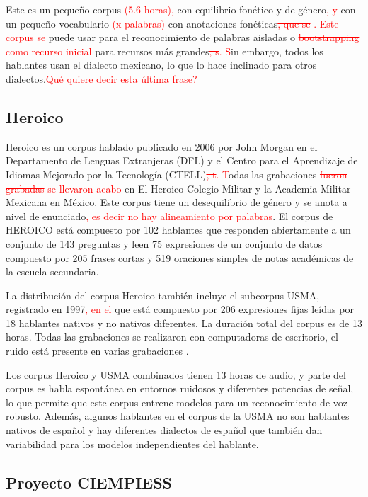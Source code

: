 \documentclass[a4paper,12pt,twoside]{report}
\newcommand{\macb}{\textcolor{red}}
\begin{document}
Este es un pequeño corpus \macb{(5.6 horas), } con equilibrio fonético y de género\macb{, y} con un pequeño vocabulario \macb{(x palabras)} con anotaciones fonéticas\macb{\st{, que se }. Este corpus se }puede usar para el reconocimiento de palabras aisladas o \macb{\st{bootstrapping} como recurso inicial} para recursos más grandes\macb{\st{; s}. S}in embargo, todos los hablantes usan el dialecto mexicano, lo que lo hace inclinado para otros dialectos.\macb{Qu\'e quiere decir esta \'ultima frase?}

\subsection{Heroico}

Heroico es un corpus hablado publicado en 2006 por John Morgan en el Departamento de Lenguas Extranjeras (DFL) y el Centro para el Aprendizaje de Idiomas Mejorado por la Tecnología (CTELL)\macb{\st{, t}. T}odas las grabaciones \macb{\st{fueron grabadas} se llevaron acabo} en El Heroico Colegio Militar y la Academia Militar Mexicana en México. Este corpus tiene un desequilibrio de género y se anota a nivel de enunciado\macb{, es decir no hay alineamiento por palabras}. El corpus de HEROICO está compuesto por 102 hablantes que responden abiertamente a un conjunto de 143 preguntas y leen 75 expresiones de un conjunto de datos compuesto por 205 frases cortas y 519 oraciones simples de notas académicas de la escuela secundaria.

La distribución del corpus Heroico también incluye el subcorpus USMA, registrado en 1997\macb{, \st{ en el}} que está compuesto por 206 expresiones fijas leídas por 18 hablantes nativos y no nativos diferentes. La duración total del corpus es de 13 horas. Todas las grabaciones se realizaron con computadoras de escritorio, el ruido está presente en varias grabaciones \cite{heroico}.

Los corpus Heroico y USMA combinados tienen 13 horas de audio, y parte del corpus es habla espontánea en entornos ruidosos y diferentes potencias de señal, lo que permite que este corpus entrene modelos para un reconocimiento de voz robusto. Además, algunos hablantes en el corpus de la USMA no son hablantes nativos de español y hay diferentes dialectos de español que también dan variabilidad para los modelos independientes del hablante.

\subsection{Proyecto CIEMPIESS}
\end{document}
